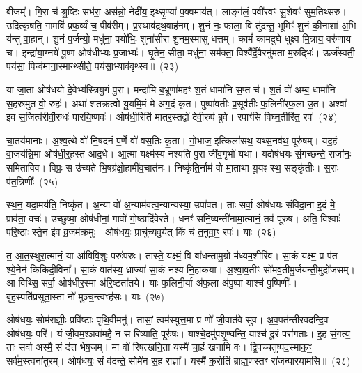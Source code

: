 बीजम्᳚। गि॒रा च॑ श्रु॒ष्टिः सभ॑रा॒ अस॑न्नो॒ नेदी॑य॒ इथ्सृ॒ण्या॑ प॒क्वमाय॑त्। लाङ्ग॑लं॒ पवी॑रवꣳ सु॒शेवꣳ॑ सुम॒तिथ्स॑रु। उदित्कृ॑षति॒ गामविं॑ प्रफ॒र्व्यं॑ च॒ पीव॑रीम्। प्र॒स्थाव॑द्रथ॒वाह॑नम्। शु॒नं नः॒ फाला॒ वि तु॑दन्तु॒ भूमिꣳ॑ शु॒नं की॒नाशा॑ अ॒भि य॑न्तु वा॒हान्। शु॒नं प॒र्जन्यो॒ मधु॑ना॒ पयो॑भिः॒ शुना॑सीरा शु॒नम॒स्मासु॑ धत्तम्। कामं॑ कामदुघे धुक्ष्व मि॒त्राय॒ वरु॑णाय च। इन्द्रा॑या॒ग्नये॑ पू॒ष्ण ओष॑धीभ्यः प्र॒जाभ्यः॑। घृ॒तेन॒ सीता॒ मधु॑ना॒ सम॑क्ता॒ विश्वै᳚र्दे॒वैरनु॑मता म॒रुद्भिः॑। ऊर्ज॑स्वती॒ पय॑सा॒ पिन्व॑माना॒स्मान्थ्सी॑ते॒ पय॑सा॒भ्याव॑वृथ्स्व॥~(२३)

{\anuvakamend[{समो॑कसौ विश्वरूपे वि॒दुर्निर्\mbox{}ऋ॑तिर॒भि च॑ष्ट इ॒ह मि॒त्राय॒ द्वाविꣳ॑शतिश्च}]}%

या जा॒ता ओष॑धयो दे॒वेभ्य॑स्त्रियु॒गं पु॒रा। मन्दा॑मि ब॒भ्रूणा॑महꣳ श॒तं धामा॑नि स॒प्त च॑। श॒तं वो॑ अम्ब॒ धामा॑नि स॒हस्र॑मुत वो॒ रुहः॑। अथा॑ शतक्रत्वो यू॒यमि॒मं मे॑ अग॒दं कृ॑त। पुष्पा॑वतीः प्र॒सूव॑तीः फ॒लिनी॑रफ॒ला उ॒त। अश्वा॑ इव स॒जित्व॑रीर्वी॒रुधः॑ पारयि॒ष्णवः॑। ओष॑धी॒रिति॑ मातर॒स्तद्वो॑ देवी॒रुप॑ ब्रुवे। रपाꣳ॑सि विघ्न॒तीरि॑त॒ रपः॑~(२४)

चा॒तय॑मानाः। अ॒श्व॒त्थे वो॑ नि॒षद॑नं प॒र्णे वो॑ वस॒तिः कृ॒ता। गो॒भाज॒ इत्किला॑सथ॒ यथ्स॒नव॑थ॒ पूरु॑षम्। यद॒हं वा॒जय॑न्नि॒मा ओष॑धी॒र्॒\mbox{}हस्त॑ आद॒धे। आ॒त्मा यक्ष्म॑स्य नश्यति पु॒रा जी॑व॒गृभो॑ यथा। यदोष॑धयः सं॒गच्छ॑न्ते॒ राजा॑नः॒ समि॑ताविव। विप्रः॒ स उ॑च्यते भि॒षग्र॑क्षो॒हामी॑व॒चात॑नः। निष्कृ॑ति॒र्नाम॑ वो मा॒ताथा॑ यू॒यꣴ स्थ॒ सङ्कृ॑तीः। स॒राः प॑त॒त्रिणीः᳚~(२५)

स्थ॒न॒ यदा॒मय॑ति॒ निष्कृ॑त। अ॒न्या वो॑ अ॒न्याम॑वत्व॒न्यान्यस्या॒ उपा॑वत। ताः सर्वा॒ ओष॑धयः संविदा॒ना इ॒दं मे॒ प्राव॑ता॒ वचः॑। उच्छुष्मा॒ ओष॑धीनां॒ गावो॑ गो॒ष्ठादि॑वेरते। धनꣳ॑ सनि॒ष्यन्ती॑नामा॒त्मानं॒ तव॑ पूरुष। अति॒ विश्वाः᳚ परि॒ष्ठाः स्ते॒न इ॑व व्र॒जम॑क्रमुः। ओष॑धयः॒ प्राचु॑च्यवु॒र्यत् किं च॑ त॒नुवा॒ꣳ॒ रपः॑। याः~(२६)

त॒ आ॒त॒स्थुरा॒त्मानं॒ या आ॑विवि॒शुः परुः॑परुः। तास्ते॒ यक्ष्मं॒ वि बा॑धन्तामु॒ग्रो म॑ध्यम॒शीरि॑व। सा॒कं य॑क्ष्म॒ प्र प॑त श्ये॒नेन॑ किकिदी॒विना᳚। सा॒कं वात॑स्य॒ ध्राज्या॑ सा॒कं न॑श्य नि॒हाक॑या। अ॒श्वा॒व॒तीꣳ सो॑मव॒तीमू॒र्जय॑न्ती॒\-मुदो॑जसम्। आ वि॑थ्सि॒ सर्वा॒ ओष॑धीर॒स्मा अ॑रि॒ष्टता॑तये। याः फ॒लिनी॒र्या अ॑फ॒ला अ॑पु॒ष्पा याश्च॑ पु॒ष्पिणीः᳚। बृह॒स्पति॑प्रसूता॒स्ता नो॑ मुञ्च॒न्त्वꣳह॑सः। याः~(२७)

ओष॑धयः॒ सोम॑राज्ञीः॒ प्रवि॑ष्टाः पृथि॒वीमनु॑। तासां॒ त्वम॑स्युत्त॒मा प्र णो॑ जी॒वात॑वे सुव। अ॒व॒पत॑न्तीरवदन्दि॒व ओष॑धयः॒ परि॑। यं जी॒वम॒श्ञवा॑महै॒ न स रि॑ष्याति॒ पूरु॑षः। याश्चे॒दमु॑पशृ॒ण्वन्ति॒ याश्च॑ दू॒रं परा॑गताः। इ॒ह सं॒गत्य॒ ताः सर्वा॑ अस्मै॒ सं द॑त्त भेष॒जम्। मा वो॑ रिषत्खनि॒ता यस्मै॑ चा॒हं खना॑मि वः। द्वि॒पच्चतु॑ष्पद॒स्माक॒ꣳ॒ सर्व॑म॒स्त्वना॑तुरम्। ओष॑धयः॒ सं व॑दन्ते॒ सोमे॑न स॒ह राज्ञा᳚। यस्मै॑ क॒रोति॑ ब्राह्म॒णस्तꣳ रा॑जन्पारयामसि॥~(२८)

